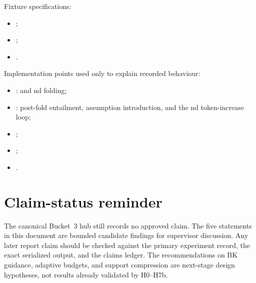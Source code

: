 \documentclass[11pt]{article}
\DeclareRobustCommand{\code}[1]{\texttt{\detokenize{#1}}}
\begin{document}
Fixture specifications:

\begin{itemize}
  \item {};
  \item {};
  \item {}.
\end{itemize}

Implementation points used only to explain recorded behaviour:

\begin{itemize}
  \item {}: \code{fold_greedy/3} and nd folding;
  \item {}: post-fold entailment, assumption introduction, and the
  nd token-increase loop;
  \item {};
  \item {};
  \item {}.
\end{itemize}

\section{Claim-status reminder}

The canonical Bucket~3 hub still records no approved claim. The five statements
in this document are bounded candidate findings for supervisor discussion.
Any later report claim should be checked against the primary experiment record,
the exact serialized output, and the claims ledger. The recommendations on BK
guidance, adaptive budgets, and support compression are next-stage design
hypotheses, not results already validated by H0--H7b.
\end{document}
